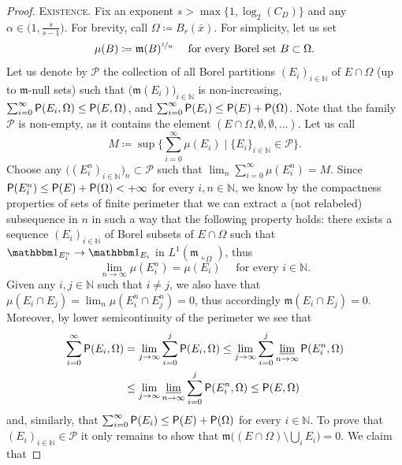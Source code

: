 \documentclass[reqno]{amsart}
\numberwithin{equation}{section}
\newcommand{\N}{\mathbb{N}}
\newcommand{\mm}{\mathfrak m}
\newcommand{\1}{\mathbbm 1}
\newcommand{\limi}{\varliminf}
\renewcommand{\P}{{\sf P}}
\begin{document}
\begin{proof} {\color{blue}\textsc{Existence.}}
Fix an exponent \(s>\max\big\{1,\log_2(C_D)\big\}\) and any
\(\alpha\in\big(1,\frac{s}{s-1}\big)\). For brevity, call
\(\Omega\coloneqq B_r(\bar x)\). For simplicity, let us set
\[
\mu(B)\coloneqq\mm(B)^{\nicefrac{1}{\alpha}}
\quad\text{ for every Borel set }B\subset\Omega.
\]
Let us denote by \(\mathcal P\) the collection of all
Borel partitions \((E_i)_{i\in\N}\) of \(E\cap\Omega\)
(up to \(\mm\)-null sets) such that \(\big(\mm(E_i)\big)_{i\in\N}\) is non-increasing,
\(\sum_{i=0}^\infty\P(E_i,\Omega)\leq\P(E,\Omega)\), and
\(\sum_{i=0}^\infty\P(E_i)\leq\P(E)+\P(\Omega)\).
Note that the family \(\mathcal P\) is non-empty, as it contains the element
\((E\cap\Omega,\emptyset,\emptyset,\ldots)\). Let us call
\begin{equation}\label{eq:decomposition_thm_aux_0}
M\coloneqq\sup\bigg\{\sum_{i=0}^\infty\mu(E_i)\;\bigg|
\;\{E_i\}_{i\in\N}\in\mathcal P\bigg\}.
\end{equation}
Choose any \(\big((E^n_i)_{i\in\N}\big)_n\subset\mathcal P\)
such that \(\lim_n\sum_{i=0}^\infty\mu(E^n_i)=M\).
Since \(\P(E^n_i)\leq\P(E)+\P(\Omega)<+\infty\) for every \(i,n\in\N\),
we know by the compactness properties of sets of
finite perimeter that we can extract a (not relabeled) subsequence in \(n\)
in such a way that the following property holds: there exists a sequence
\((E_i)_{i\in\N}\) of Borel subsets of \(E\cap\Omega\) such that
\(\1_{E^n_i}\to\1_{E_i}\) in \(L^1(\mm\llcorner_\Omega)\), thus
\begin{equation}\label{eq:decomposition_thm_aux_1}
\lim_{n\to\infty}\mu(E^n_i)=\mu(E_i)\quad\text{ for every }i\in\N.
\end{equation}
Given any \(i,j\in\N\) such that \(i\neq j\), we also have that
\(\mu(E_i\cap E_j)=\lim_n\mu(E^n_i\cap E^n_j)=0\), thus accordingly
\(\mm(E_i\cap E_j)=0\). Moreover, by lower semicontinuity of the perimeter
we see that
\[\begin{split}
\sum_{i=0}^\infty\P(E_i,\Omega)&=\lim_{j\to\infty}\sum_{i=0}^j\P(E_i,\Omega)
\leq\lim_{j\to\infty}\sum_{i=0}^j\limi_{n\to\infty}\P(E^n_i,\Omega)\\
&\leq\lim_{j\to\infty}\limi_{n\to\infty}\sum_{i=0}^j\P(E^n_i,\Omega)\leq\P(E,\Omega)
\end{split}\]
and, similarly, that \(\sum_{i=0}^\infty\P(E_i)\leq\P(E)+\P(\Omega)\) for every \(i\in\N\).
To prove that \((E_i)_{i\in\N}\in\mathcal P\) it only remains to show that
\(\mm\big((E\cap\Omega)\setminus\bigcup_i E_i\big)=0\). We claim that

\end{proof}
\end{document}
